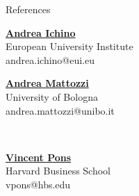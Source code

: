 \documentclass{resume} %
\begin{document}
\begin{rSection}{References}
	
	\parbox{0.5\textwidth}{
		\href{http://www.andreaichino.it/}{{\bf Andrea Ichino}}
		\\ European University Institute
		\\ andrea.ichino@eui.eu
	\\ }
	\hfill
	\parbox{0.5\textwidth}{
		\href{https://sites.google.com/view/andrea-mattozzi/home}{{\bf Andrea Mattozzi}}  
		\\ University of Bologna
		\\ andrea.mattozzi@unibo.it
	
	\\  }  

	\parbox{0.5\textwidth}{
		\href{https://www.vincentpons.org/}{{\bf Vincent Pons}}
		\\ Harvard Business School
		\\ vpons@hbs.edu
	
	\\ }


	
	
	
		
\end{rSection}

\vspace{10mm}

\small
\end{document}
